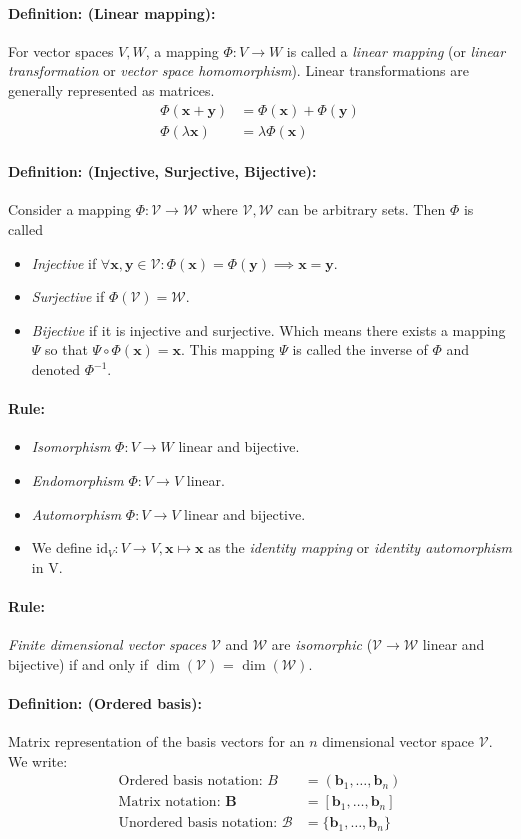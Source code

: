 \documentclass[12pt]{article}
\newcommand{\vecs}[2]{{\bm{#1}_1, \dots, \bm{#1}_#2}}
\newcommand{\xdefinition}[2]{\paragraph{\colorbox{#1!30}{\textbf{Definition:}} (#2):}}
\newcommand{\xrule}[1]{\paragraph{\colorbox{#1!30}{\textbf{Rule:}}}}
\newcommand{\mc}[1]{\mathcal{#1}}
\begin{document}
\xdefinition{blue}{Linear mapping} For vector spaces $V, W$, a mapping $\Phi : V \rightarrow W$ is called a \textit{linear mapping} (or \textit{linear transformation} or \textit{vector space homomorphism}). Linear transformations are generally represented as matrices.
%
\begin{equation}
\begin{aligned}
	\Phi(\bm{x} + \bm{y}) &= \Phi(\bm{x}) + \Phi(\bm{y}) \\
	\Phi(\lambda \bm{x}) &= \lambda \Phi(\bm{x})
\end{aligned}
\end{equation}

\xdefinition{blue}{Injective, Surjective, Bijective} Consider a mapping $\Phi : \mc{V} \rightarrow \mc{W}$ where $\mc{V}, \mc{W}$ can be arbitrary sets. Then $\Phi$ is called
%
\begin{itemize}
	\item \textit{Injective} if $\forall \bm{x}, \bm{y} \in \mc{V} : \Phi(\bm{x}) = \Phi(\bm{y}) \implies \bm{x} = \bm{y}$.
	\item \textit{Surjective} if $\Phi(\mc{V}) = \mc{W}$.
	\item \textit{Bijective} if it is injective and surjective. Which means there exists a mapping $\Psi$ so that $\Psi \circ \Phi(\bm{x}) = \bm{x}$. This mapping $\Psi$ is called the inverse of $\Phi$ and denoted $\Phi^{-1}$.
\end{itemize}

\xrule{blue}
%
\begin{itemize}
	\item \textit{Isomorphism} $\Phi : V \rightarrow W$ linear and bijective.
	\item \textit{Endomorphism} $\Phi : V \rightarrow V$ linear.
	\item \textit{Automorphism} $\Phi : V \rightarrow V$ linear and bijective.
	\item We define $\text{id}_V : V \rightarrow V, \bm{x} \mapsto \bm{x}$ as the \textit{identity mapping} or \textit{identity automorphism} in V.
\end{itemize}

\xrule{green} \textit{Finite dimensional vector spaces} $\mc{V}$ and $\mc{W}$ are \textit{isomorphic} ($\mc{V} \rightarrow \mc{W}$ linear and bijective) if and only if $\dim(\mc{V})$ = $\dim(\mc{W})$.

\xdefinition{green}{Ordered basis} Matrix representation of the basis vectors for an $n$ dimensional vector space $\mc{V}$. We write:
%
\begin{equation}
\begin{aligned}
	\text{Ordered basis notation: } B &= (\vecs{b}{n}) \\
	\text{Matrix notation: } \bm{B} &= [\vecs{b}{n}] \\
	\text{Unordered basis notation: } \mc{B} &= \{\vecs{b}{n}\}
\end{aligned}
\end{equation}
\end{document}
